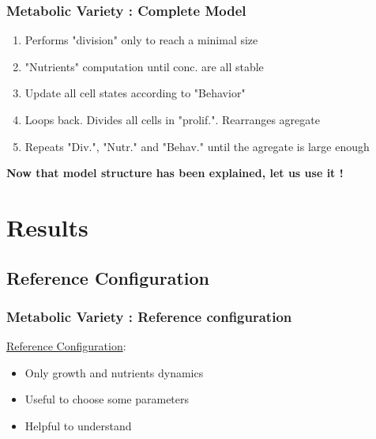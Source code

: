 \documentclass{beamer}
\begin{document}
\begin{frame}
\frametitle{Metabolic Variety : Complete Model}
\begin{center}
\end{center}
\vspace{0.6cm}
\small{
\begin{enumerate}
\item<2-> Performs "division" only to reach a minimal size
\item<3-> "Nutrients" computation until conc. are all stable
\item<4-> Update all cell states according to "Behavior" 
\item<5-> Loops back. Divides all cells in "prolif.". Rearranges agregate 
\item<6-> Repeats "Div.", "Nutr." and "Behav." until the agregate is  large enough
\end{enumerate}
}
\end{frame}

\begin{frame}
\textbf{Now that model structure has been explained, let us use it ! }
\end{frame}
\section{Results}
\subsection{Reference Configuration}

\begin{frame}
\frametitle{Metabolic Variety : Reference configuration}
\underline{Reference Configuration}: 
\begin{itemize}
\item Only growth and nutrients dynamics
\item Useful to choose some parameters 
\item Helpful to understand
\end{itemize}

\end{frame}
\end{document}
